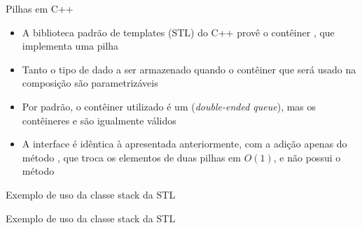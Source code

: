 \begin{frame}[fragile]{Pilhas em C++}

    \begin{itemize}
        \item A biblioteca padrão de templates (STL) do C++ provê o contêiner ,
            que implementa uma pilha

        \item Tanto o tipo de dado a ser armazenado quando o contêiner que será usado na composição
            são parametrizáveis

        \item Por padrão, o contêiner utilizado é um  (\textit{double-ended queue}),
            mas os contêineres  e  são igualmente válidos

        \item A interface é idêntica à apresentada anteriormente, com a adição apenas do método
            , que troca os elementos de duas pilhas em $O(1)$, e não possui o
            método 

    \end{itemize}

\end{frame}

\begin{frame}[fragile]{Exemplo de uso da classe stack da STL}
\end{frame}

\begin{frame}[fragile]{Exemplo de uso da classe stack da STL}
\end{frame}
